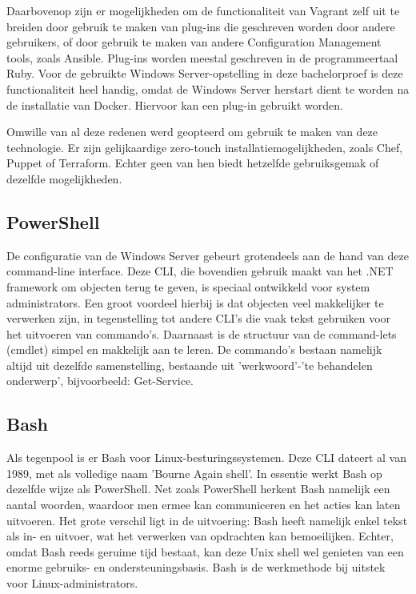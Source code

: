 Daarbovenop zijn er mogelijkheden om de functionaliteit van Vagrant zelf uit te breiden door gebruik te maken van plug-ins die geschreven worden door andere gebruikers, of door gebruik te maken van andere Configuration Management tools, zoals Ansible. Plug-ins worden meestal geschreven in de programmeertaal Ruby. Voor de gebruikte Windows Server-opstelling in deze bachelorproef is deze functionaliteit heel handig, omdat de Windows Server herstart dient te worden na de installatie van Docker. Hiervoor kan een plug-in gebruikt worden.

Omwille van al deze redenen werd geopteerd om gebruik te maken van deze technologie. Er zijn gelijkaardige zero-touch installatiemogelijkheden, zoals Chef, Puppet of Terraform. Echter geen van hen biedt hetzelfde gebruiksgemak of dezelfde mogelijkheden. \autocite{Sturgeon2012}

\subsection{PowerShell}
De configuratie van de Windows Server gebeurt grotendeels aan de hand van deze command-line interface. Deze CLI, die bovendien gebruik maakt van het .NET framework om objecten terug te geven, is speciaal ontwikkeld voor system administrators. Een groot voordeel hierbij is dat objecten veel makkelijker te verwerken zijn, in tegenstelling tot andere CLI’s die vaak tekst gebruiken voor het uitvoeren van commando’s. Daarnaast is de structuur van de command-lets (cmdlet) simpel en makkelijk aan te leren. De commando’s bestaan namelijk altijd uit dezelfde samenstelling, bestaande uit 'werkwoord'-'te behandelen onderwerp', bijvoorbeeld: Get-Service. \autocite{Pichardo2014}

\subsection{Bash}
Als tegenpool is er Bash voor Linux-besturingssystemen. Deze CLI dateert al van 1989, met als volledige naam 'Bourne Again shell'. In essentie werkt Bash op dezelfde wijze als PowerShell. Net zoals PowerShell herkent Bash namelijk een aantal woorden, waardoor men ermee kan communiceren en het acties kan laten uitvoeren. Het grote verschil ligt in de uitvoering: Bash heeft namelijk enkel tekst als in- en uitvoer, wat het verwerken van opdrachten kan bemoeilijken. Echter, omdat Bash reeds geruime tijd bestaat, kan deze Unix shell wel genieten van een enorme gebruiks- en ondersteuningsbasis. Bash is de werkmethode bij uitstek voor Linux-administrators. \autocite{Billemont2018} \autocite{Baker2018}

